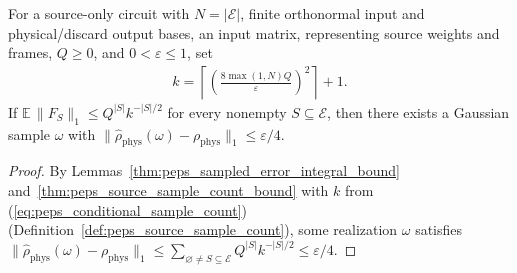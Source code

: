 \begin{lemma}
    \label{thm:peps_source_sample_choice_conditional}
    \leanok
    For a source-only circuit with $N=|\mathcal E|$, finite orthonormal input
    and physical/discard output bases, an input matrix, representing source
    weights and frames, $Q\geq0$, and $0<\varepsilon\leq1$, set
    \begin{align}
        k=\left\lceil\left(\frac{8\max(1,N)Q}{\varepsilon}\right)^2\right\rceil+1.
        \label{eq:peps_conditional_sample_count}
    \end{align}
    If $\mathbb E\,\|F_S\|_1\leq Q^{|S|}k^{-|S|/2}$ for every nonempty
    $S\subseteq\mathcal E$, then there exists a Gaussian sample $\omega$ with
    $\|\widehat\rho_{\mathrm{phys}}(\omega)-\rho_{\mathrm{phys}}\|_1\le\varepsilon/4$.
\end{lemma}
\begin{proof}
    \leanok
    By Lemmas~\ref{thm:peps_sampled_error_integral_bound}
    and~\ref{thm:peps_source_sample_count_bound} with $k$ from
    (\ref{eq:peps_conditional_sample_count})
    (Definition~\ref{def:peps_source_sample_count}), some realization $\omega$
    satisfies
    $\|\widehat\rho_{\mathrm{phys}}(\omega)-\rho_{\mathrm{phys}}\|_1
        \le\sum_{\varnothing\neq S\subseteq\mathcal E}Q^{|S|}k^{-|S|/2}\le\varepsilon/4$.
\end{proof}

